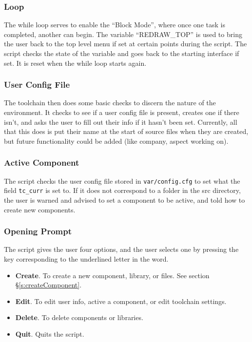 \documentclass[a4paper, oneside, 11pt, titlepage, onecolumn, openright]{report}
\begin{document}
\subsubsection{Loop}
			\label{sss:VFstartLoop}
			The while loop serves to enable the ``Block Mode'', where once one task is completed, another can begin.
			The variable ``REDRAW\_TOP'' is used to bring the user back to the top level menu if set at certain points during the script. The script checks the state of the variable and goes back to the starting interface if set. It is reset when the while loop starts again.
			
\subsubsection{User Config File}
			\label{sss:VFstartUserConfigFile}
			
			The toolchain then does some basic checks to discern the nature of the environment. It checks to see if a user config file is present, creates one if there isn't, and asks the user to fill out their info if it hasn't been set. 
			Currently, all that this does is put their name at the start of source files when they are created, but future functionality could be added (like company, aspect working on).
			
\subsubsection{Active Component}
			\label{sss:VFstartActiveComponent}
			
			The script checks the user config file stored in \texttt{var/config.cfg} to set what the field \texttt{tc\_curr} is set to. If it does not correspond to a folder in the src directory, the user is warned and advised to set a component to be active, and told how to create new components.
			
\subsubsection{Opening Prompt}
			\label{sss:VFstartOpeningPrompt}
			The script gives the user four options, and the user selects one by pressing the key corresponding to the underlined letter in the word.
\begin{itemize}
\item \textbf{Create}. To create a new component, library, or files. See section \S\ref{s:createComponent}.
\item \textbf{Edit}. To edit user info, active a component, or edit toolchain settings.
\item \textbf{Delete}. To delete components or libraries.
\item \textbf{Quit}. Quits the script.
\end{itemize}			
			 
\end{document}
